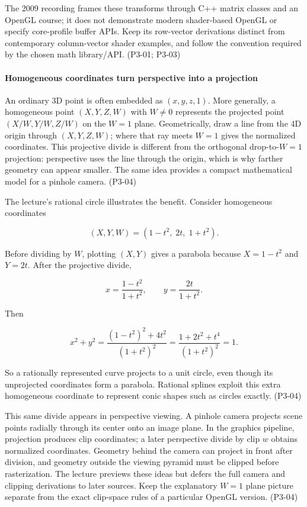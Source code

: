 The 2009 recording frames these transforms through C++ matrix classes and an OpenGL course; it does not demonstrate modern shader-based OpenGL or specify core-profile buffer APIs. Keep its row-vector derivations distinct from contemporary column-vector shader examples, and follow the convention required by the chosen math library/API. (P3-01; P3-03)

\paragraph{Homogeneous coordinates turn perspective into a projection}\label{03-visual-computing-i-ch001-homogeneous-coordinates-turn-perspective-into-a-projection}

\hypertarget{03-visual-computing-i-ch001-homogeneous-coordinates-turn-perspective-into-a-projection}{}

An ordinary 3D point is often embedded as \((x,y,z,1)\). More generally, a homogeneous point \((X,Y,Z,W)\) with \(W\ne0\) represents the projected point \((X/W,Y/W,Z/W)\) on the \(W=1\) plane. Geometrically, draw a line from the 4D origin through \((X,Y,Z,W)\); where that ray meets \(W=1\) gives the normalized coordinates. This projective divide is different from the orthogonal drop-to-\(W=1\) projection: perspective uses the line through the origin, which is why farther geometry can appear smaller. The same idea provides a compact mathematical model for a pinhole camera. (P3-04)

The lecture's rational circle illustrates the benefit. Consider homogeneous coordinates

\[
(X,Y,W)=(1-t^2,\;2t,\;1+t^2).
\]

Before dividing by \(W\), plotting \((X,Y)\) gives a parabola because \(X=1-t^2\) and \(Y=2t\). After the projective divide,

\[
x=\frac{1-t^2}{1+t^2},\qquad y=\frac{2t}{1+t^2}.
\]

Then

\[
x^2+y^2=\frac{(1-t^2)^2+4t^2}{(1+t^2)^2}
=\frac{1+2t^2+t^4}{(1+t^2)^2}=1.
\]

So a rationally represented curve projects to a unit circle, even though its unprojected coordinates form a parabola. Rational splines exploit this extra homogeneous coordinate to represent conic shapes such as circles exactly. (P3-04)

This same divide appears in perspective viewing. A pinhole camera projects scene points radially through its center onto an image plane. In the graphics pipeline, projection produces clip coordinates; a later perspective divide by clip \(w\) obtains normalized coordinates. Geometry behind the camera can project in front after division, and geometry outside the viewing pyramid must be clipped before rasterization. The lecture previews these ideas but defers the full camera and clipping derivations to later sources. Keep the explanatory \(W=1\) plane picture separate from the exact clip-space rules of a particular OpenGL version. (P3-04)

